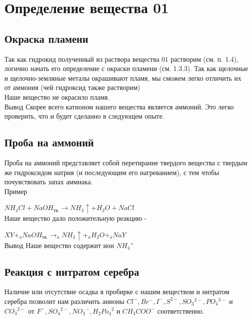 \documentclass[a4paper,14pt,titlepage,twoside]{article}
\begin{document}
    \newpage
    \section{Определение вещества 01}
        \subsection{Окраска пламени}
            Так как гидрокид полученный из раствора вещества $01$ растворим (см. п. 1.4),
            логично начать его определение с окраски пламени (см. 1.3.3). Так как щелочные
            и щелочно-земляные металы окрашивают пламя, мы сможем легко отличить их от 
            аммония (чей гидроксид также растворим)\\

            Наше вещество не окрасило пламя.\\

            Вывод \newline
            Скорее всего катионом нашего вещества является аммоний.
            Это легко проверить, что и будет сделанно в следующем опыте.
            
        \subsection{Проба на аммоний}
            Проба на аммоний представляет собой перетирание твердого вещества 
            с твердым же гидроксидом натрия (и последующим его нагреванием), с тем чтобы
            почувствовать запах аммиака.\\

            
            Пример

            $NH_4Cl+NaOH_{\mbox{тв.}}\to NH_3\uparrow + H_2O + NaCl$\\

            Наше вещество дало положительную реакцию -
            
            $XY + _aNaOH_{\mbox{тв.}}\to _aNH_3\uparrow + _aH_2O + _aNaY$\\
            
            Вывод\newline
            Наше вещество содержит ион $NH_4{}^+$

        \subsection{Реакция с нитратом серебра}
            Наличие или отсутствие осадка в пробирке с нашим веществом и нитратом серебра
            позволит нам различить анионы $Cl^-, Br^-, I^-,  S^{2-}, SO_3{}^{2-}, PO_4{}^{3-} $ и $ CO_3{}^{2-}$ 
            от $F^-, SO_4{}^{2-}, NO_3{}^-, H_2Po_4{}^2$ и $CH_3COO^-$ соответственно.\\
            
\end{document}
